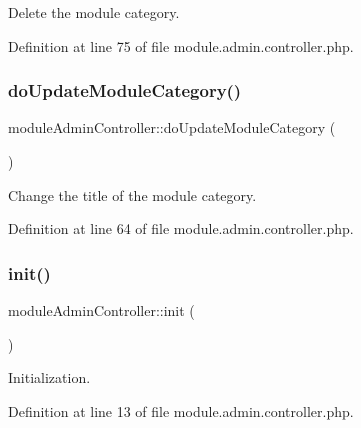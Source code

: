 Delete the module category. 



Definition at line 75 of file module.\+admin.\+controller.\+php.

\hypertarget{classmoduleAdminController_a90d82f2c0b0716c10e246f9866c9f37f}{}\label{classmoduleAdminController_a90d82f2c0b0716c10e246f9866c9f37f} 
\subsubsection{\texorpdfstring{do\+Update\+Module\+Category()}{doUpdateModuleCategory()}}
{\footnotesize\ttfamily module\+Admin\+Controller\+::do\+Update\+Module\+Category (\begin{DoxyParamCaption}{ }\end{DoxyParamCaption})}



Change the title of the module category. 



Definition at line 64 of file module.\+admin.\+controller.\+php.

\hypertarget{classmoduleAdminController_a837ce6924f939b13b35325690da032d2}{}\label{classmoduleAdminController_a837ce6924f939b13b35325690da032d2} 
\subsubsection{\texorpdfstring{init()}{init()}}
{\footnotesize\ttfamily module\+Admin\+Controller\+::init (\begin{DoxyParamCaption}{ }\end{DoxyParamCaption})}



Initialization. 



Definition at line 13 of file module.\+admin.\+controller.\+php.

\hypertarget{classmoduleAdminController_ab5a6fbd43777fcb5af9cee6e7b529291}{}\label{classmoduleAdminController_ab5a6fbd43777fcb5af9cee6e7b529291} 
